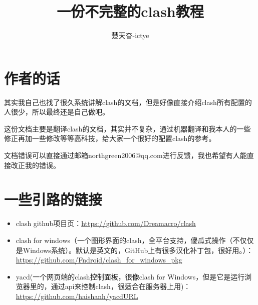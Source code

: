 \documentclass{ctexart}
\title{一份不完整的clash教程}
\author{楚天杳-ictye}
\begin{document}
\maketitle

     




\tableofcontents

\section*{作者的话}
其实我自己也找了很久系统讲解clash的文档，但是好像直接介绍clash所有配置的人很少，所以最终还是自己做吧。

这份文档主要是翻译clash的文档，其实并不复杂，通过机器翻译和我本人的一些修正再加一些修改等等高科技，给大家一个很好的配置clash的参考。

文档错误可以直接通过邮箱northgreen2006@qq.com进行反馈，我也希望有人能直接改正我的错误。

\section*{一些引路的链接}

\begin{itemize}

        \item clash github项目页：\url{https://github.com/Dreamacro/clash}
        \item clash for windows（一个图形界面的clash，全平台支持，傻瓜式操作（不仅仅是Windows系统）。默认是英文的，GitHub上有很多汉化补丁包，很好用。）：\url{https://github.com/Fndroid/clash_for_windows_pkg}
        \item yacd(一个网页端的clash控制面板，很像clash for Windows，但是它是运行浏览器里的，通过api来控制clash，很适合在服务器上用)：\url{https://github.com/haishanh/yacdURL}

\end{itemize}

















\end{document}
